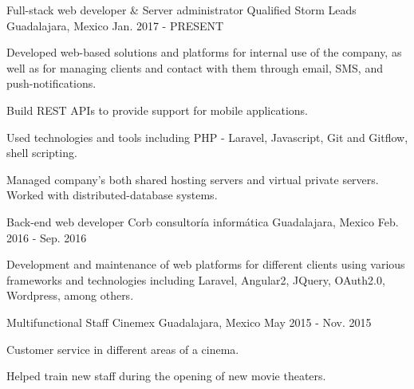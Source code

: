 \begin{cventries}
  \cventry
    {Full-stack web developer \& Server administrator}
    {Qualified Storm Leads}
    {Guadalajara, Mexico}
    {Jan. 2017 - PRESENT}
    {
      \begin{cvitems}
        \item {Developed web-based solutions and platforms for internal use of the company, as well as for managing clients and contact with them through email, SMS, and push-notifications.}
        \item {Build REST APIs to provide support for mobile applications.}
        \item {Used technologies and tools including PHP - Laravel, Javascript, Git and Gitflow, shell scripting.}
        \item {Managed company's both shared hosting servers and virtual private servers. Worked with distributed-database systems.}
      \end{cvitems}
    }
  \cventry
    {Back-end web developer}
    {Corb consultoría informática}
    {Guadalajara, Mexico}
    {Feb. 2016 - Sep. 2016}
    {
      \begin{cvitems}
        \item {Development and maintenance of web platforms for different clients using various frameworks and technologies including Laravel, Angular2, JQuery, OAuth2.0, Wordpress, among others.}
      \end{cvitems}
    }
  \cventry
    {Multifunctional Staff}
    {Cinemex}
    {Guadalajara, Mexico}
    {May 2015 - Nov. 2015}
    {
      \begin{cvitems}
        \item {Customer service in different areas of a cinema.}
        \item {Helped train new staff during the opening of new movie theaters.}
      \end{cvitems}
    }
\end{cventries}
